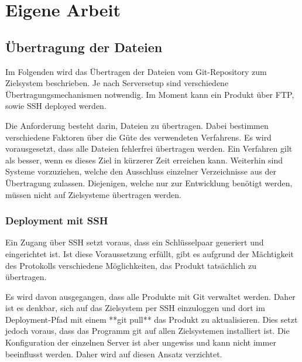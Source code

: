 

\section{Eigene Arbeit} %
\label{sec:eigene_arbeit}


\subsection{Übertragung der Dateien} %
\label{sub:Übertragung_der_dateien}

Im Folgenden wird das Übertragen der Dateien vom Git-Repository zum Zielsystem beschrieben. Je nach Serversetup sind verschiedene Übertragungsmechanismen notwendig. Im Moment kann ein Produkt über FTP, sowie SSH deployed werden.

Die Anforderung besteht darin, Dateien zu übertragen. Dabei bestimmen verschiedene Faktoren über die Güte des verwendeten Verfahrens. Es wird vorausgesetzt, dass alle Dateien fehlerfrei übertragen werden. Ein Verfahren gilt als besser, wenn es dieses Ziel in kürzerer Zeit erreichen kann. Weiterhin sind Systeme vorzuziehen, welche den Ausschluss einzelner Verzeichnisse aus der Übertragung zulassen. Diejenigen, welche nur zur Entwicklung benötigt werden, müssen nicht auf Zielsysteme übertragen werden.

\subsubsection{Deployment mit SSH} %
\label{ssub:deployment_mit_ssh}

Ein Zugang über SSH setzt voraus, dass ein Schlüsselpaar generiert und eingerichtet ist. Ist diese Voraussetzung erfüllt, gibt es aufgrund der Mächtigkeit des Protokolls verschiedene Möglichkeiten, das Produkt tatsächlich zu übertragen.

Es wird davon ausgegangen, dass alle Produkte mit Git verwaltet werden. Daher ist es denkbar, sich auf das Zielsystem per SSH einzuloggen und dort im Deployment-Pfad mit einem **git pull** das Produkt zu aktualisieren. Dies setzt jedoch voraus, dass das Programm git auf allen Zielsystemen installiert ist. Die Konfiguration der einzelnen Server ist aber ungewiss und kann nicht immer beeinflusst werden. Daher wird auf diesen Ansatz verzichtet.

